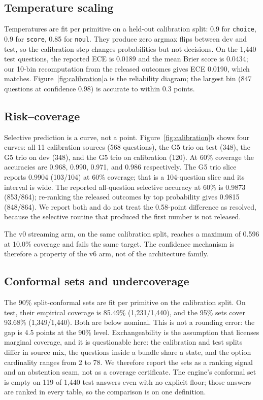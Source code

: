 \subsection{Temperature scaling}
Temperatures are fit per primitive on a held-out calibration split: 0.9 for \texttt{choice}, 0.9 for \texttt{score}, 0.85 for \texttt{noul}. They produce zero argmax flips between dev and test, so the calibration step changes probabilities but not decisions. On the 1{,}440 test questions, the reported ECE is 0.0189 and the mean Brier score is 0.0434; our 10-bin recomputation from the released outcomes gives ECE 0.0190, which matches. Figure~\ref{fig:calibration}a is the reliability diagram; the largest bin (847 questions at confidence 0.98) is accurate to within 0.3 points.

\subsection{Risk--coverage}
Selective prediction is a curve, not a point. Figure~\ref{fig:calibration}b shows four curves: all 11 calibration sources (568 questions), the G5 trio on test (348), the G5 trio on dev (348), and the G5 trio on calibration (120). At 60\% coverage the accuracies are 0.968, 0.990, 0.971, and 0.986 respectively. The G5 trio slice reports 0.9904 (103/104) at 60\% coverage; that is a 104-question slice and its interval is wide. The reported all-question selective accuracy at 60\% is 0.9873 (853/864); re-ranking the released outcomes by top probability gives 0.9815 (848/864). We report both and do not treat the 0.58-point difference as resolved, because the selective routine that produced the first number is not released.

The v0 streaming arm, on the same calibration split, reaches a maximum of 0.596 at 10.0\% coverage and fails the same target. The confidence mechanism is therefore a property of the v6 arm, not of the architecture family.

\subsection{Conformal sets and undercoverage}
The 90\% split-conformal sets are fit per primitive on the calibration split. On test, their empirical coverage is 85.49\% (1{,}231/1{,}440), and the 95\% sets cover 93.68\% (1{,}349/1{,}440). Both are below nominal. This is not a rounding error: the gap is 4.5 points at the 90\% level. Exchangeability is the assumption that licenses marginal coverage, and it is questionable here: the calibration and test splits differ in source mix, the questions inside a bundle share a state, and the option cardinality ranges from 2 to 78. We therefore report the sets as a ranking signal and an abstention seam, not as a coverage certificate. The engine's conformal set is empty on 119 of 1{,}440 test answers even with no explicit floor; those answers are ranked in every table, so the comparison is on one definition.

